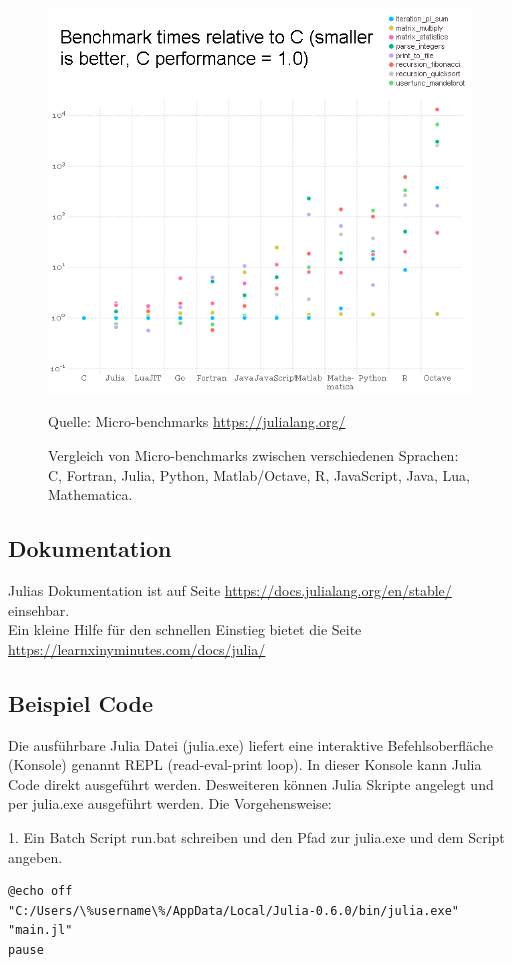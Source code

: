 \documentclass[11pt]{article}
\newcommand{\source}[1]{\caption*{Quelle: {#1}} }
\begin{document}
\newpage
\begin{figure}[h]
\begin{center}
\includegraphics[width=\textwidth]{benchmark.png}
\caption{Vergleich von Micro-benchmarks zwischen verschiedenen Sprachen: C, Fortran, Julia, Python, Matlab/Octave, R, JavaScript, Java, Lua, Mathematica.}\label{imageLabel}
\source{Micro-benchmarks \url{https://julialang.org/}}
\end{center}
\end{figure}

\newpage
\subsection{Dokumentation}
Julias Dokumentation ist auf Seite \url{https://docs.julialang.org/en/stable/} einsehbar.\\
Ein kleine Hilfe für den schnellen Einstieg bietet die Seite \url{https://learnxinyminutes.com/docs/julia/}

\subsection{Beispiel Code}
\noindent\begin{minipage}{\textwidth}
Die ausführbare Julia Datei (julia.exe) liefert eine interaktive Befehlsoberfläche (Konsole) genannt REPL (read-eval-print loop). In dieser Konsole kann Julia Code direkt ausgeführt werden. Desweiteren können Julia Skripte angelegt und per julia.exe ausgeführt werden. Die Vorgehensweise:

1. Ein Batch Script run.bat schreiben und den Pfad zur julia.exe und dem Script angeben.
\begin{lstlisting}
@echo off
"C:/Users/\%username\%/AppData/Local/Julia-0.6.0/bin/julia.exe" "main.jl"
pause
\end{lstlisting}
\end{minipage}
\end{document}
